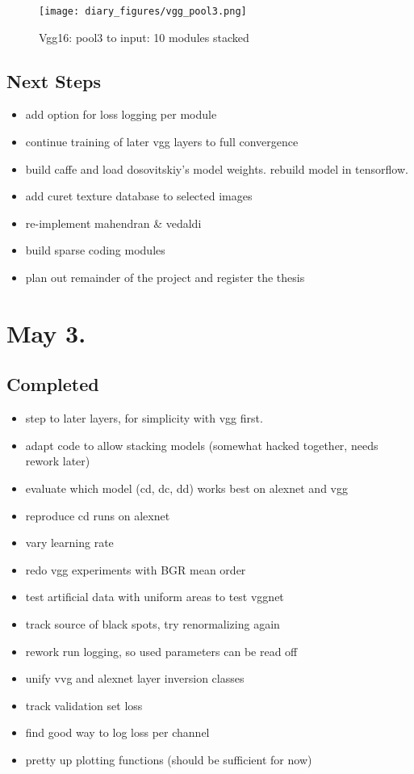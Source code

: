 \documentclass{article}
\begin{document}
\begin{figure}
    \centering
    \texttt{[image: diary\_figures/vgg\_pool3.png]}
    \caption{Vgg16: pool3 to input: 10 modules stacked}
    \label{fig:may10_v_pool3}
\end{figure}

\FloatBarrier

\subsection*{Next Steps}
\begin{itemize}
    \item add option for loss logging per module
    \item continue training of later vgg layers to full convergence
    \item build caffe and load dosovitskiy's model weights. rebuild model in tensorflow.
    \item add curet texture database to selected images
    \item re-implement mahendran \& vedaldi
    \item build sparse coding modules
    \item plan out remainder of the project and register the thesis
\end{itemize}



\section*{May 3.}

\subsection*{Completed}
\begin{itemize}
    \item step to later layers, for simplicity with vgg first.
	\item  adapt code to allow stacking models (somewhat hacked together, needs rework later)
	\item evaluate which model (cd, dc, dd) works best on alexnet and vgg
	\item reproduce cd runs on alexnet 
	\item vary learning rate 
	\item redo vgg experiments with BGR mean order
	\item test artificial data with uniform areas to test vggnet
	\item track source of black spots, try renormalizing again
	\item rework run logging, so used parameters can be read off
	\item unify vvg and alexnet layer inversion classes
	\item track validation set loss
	\item find good way to log loss per channel
	\item pretty up plotting functions (should be sufficient for now)
\end{itemize}
\end{document}
